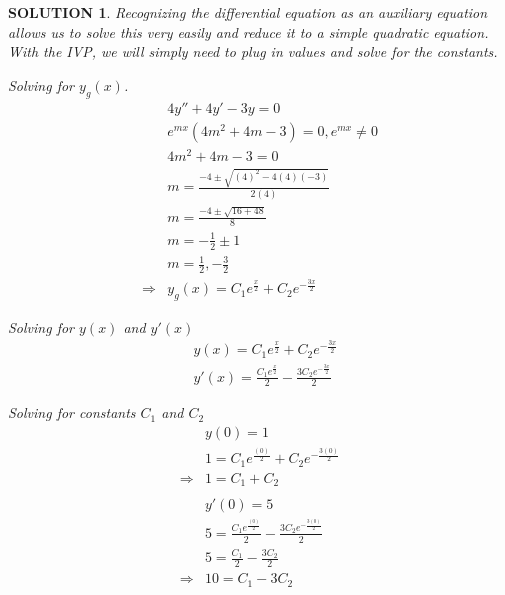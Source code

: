 \documentclass{article}
\theoremstyle{solution}
\newtheorem*{solution}{SOLUTION}
\theoremstyle{definition}
\begin{document}
\begin{solution}
    Recognizing the differential equation as an auxiliary equation allows us to solve this very 
    easily and reduce it to a simple quadratic equation. With the IVP, we will simply need to plug in 
    values and solve for the constants.

    Solving for $y_g(x)$.
    \begin{align*}
                        & 4y''+4y'-3y=0 \\
                        & e^{mx} \left(4m^{2} +4m -3\right) = 0, e^{mx} \neq 0 \\
                        & 4m^{2} + 4m - 3 = 0 \\
                        & m = \frac{-4 \pm \sqrt{(4)^2 - 4(4)(-3)}}{2(4)} \\
                        & m = \frac{-4 \pm \sqrt{16+48}}{8} \\
                        & m = -\frac{1}{2} \pm 1 \\
                        & m = \frac{1}{2}, -\frac{3}{2} \\
     \Longrightarrow    & \boxed{y_g(x) = C_1 e^{\frac{x}{2}} + C_2e^{-\frac{3x}{2}}}
    \end{align*}

    Solving for $y(x)$ and $y'(x)$
    \begin{align*}
        & y(x) = C_1 e^{\frac{x}{2}} + C_2 e^{-\frac{3x}{2}} \\
        & y'(x) = \frac{C_1e^{\frac{x}{2}}}{2} - \frac{3C_2e^{-\frac{3x}{2}}}{2} 
    \end{align*}

    Solving for constants $C_1$ and $C_2$
    \begin{align*}
        & y(0) = 1 \\
        & 1 = C_1 e^{\frac{(0)}{2}} + C_2 e^{-\frac{3(0)}{2}} \\
    \Longrightarrow    & 1 = C_1 + C_2 \\\\
        & y'(0) = 5 \\
        & 5 = \frac{C_1e^{\frac{(0)}{2}}}{2} - \frac{3C_2e^{-\frac{3(0)}{2}}}{2} \\
        & 5 = \frac{C_1}{2} - \frac{3C_2}{2} \\
        \Longrightarrow  &  10 = C_1 - 3C_2
    \end{align*}



\end{solution}
\end{document}
